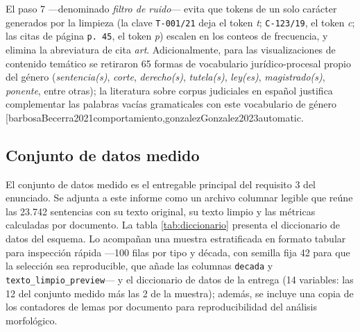 \documentclass[11pt]{tg_usta}
\makeatletter
\renewcommand{\cite}{\@ifnextchar[{\@tempswatrue\@citex}{\@tempswafalse\@citex[]}}
\makeatother
\begin{document}
El paso 7 ---denominado \emph{filtro de ruido}--- evita que tokens de un solo carácter generados por la limpieza (la clave \texttt{T-001/21} deja el token \emph{t}; \texttt{C-123/19}, el token \emph{c}; las citas de página \texttt{p.~45}, el token \emph{p}) escalen en los conteos de frecuencia, y elimina la abreviatura de cita \emph{art}. Adicionalmente, para las visualizaciones de contenido temático se retiraron 65 formas de vocabulario jurídico-procesal propio del género (\emph{sentencia(s)}, \emph{corte}, \emph{derecho(s)}, \emph{tutela(s)}, \emph{ley(es)}, \emph{magistrado(s)}, \emph{ponente}, entre otras); la literatura sobre corpus judiciales en español justifica complementar las palabras vacías gramaticales con este vocabulario de género \cite{barbosaBecerra2021comportamiento,gonzalezGonzalez2023automatic}.

\subsection{Conjunto de datos medido}
\label{sec:dataset}
El conjunto de datos medido es el entregable principal del requisito 3 del enunciado. Se adjunta a este informe como un archivo columnar legible que reúne las 23.742 sentencias con su texto original, su texto limpio y las métricas calculadas por documento. La tabla \ref{tab:diccionario} presenta el diccionario de datos del esquema. Lo acompañan una muestra estratificada en formato tabular para inspección rápida ---100 filas por tipo y década, con semilla fija 42 para que la selección sea reproducible, que añade las columnas \texttt{decada} y \texttt{texto\_limpio\_preview}--- y el diccionario de datos de la entrega (14 variables: las 12 del conjunto medido más las 2 de la muestra); además, se incluye una copia de los contadores de lemas por documento para reproducibilidad del análisis morfológico.
\end{document}
